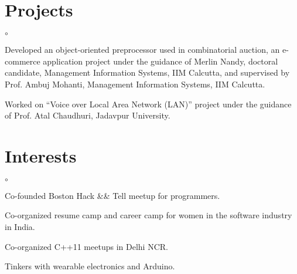 \documentclass[margin,line]{res}
\newenvironment{list2}{
  \begin{list}{$\circ$}{%
      \setlength{\itemsep}{0in}
      \setlength{\parsep}{0in} \setlength{\parskip}{0in}
      \setlength{\topsep}{0in} \setlength{\partopsep}{0in}
      \setlength{\leftmargin}{0.2in}}}{\end{list}}
\begin{document}
\begin{resume}
\section{\sc Projects}
\begin{list2} %
\item Developed an object-oriented preprocessor used in combinatorial auction, an e-commerce application project under the guidance of Merlin Nandy, doctoral candidate, Management Information Systems, IIM Calcutta, and supervised by Prof. Ambuj Mohanti, Management Information Systems, IIM Calcutta.
\item Worked on “Voice over Local Area Network (LAN)” project under the guidance of Prof. Atal Chaudhuri, Jadavpur University.
\end{list2}
\section{\sc Interests}
\begin{list2} %
\item Co-founded Boston Hack \&\& Tell meetup for programmers.
\item Co-organized resume camp and career camp for women in the software industry in India.
\item Co-organized C++11 meetups in Delhi NCR.
\item Tinkers with wearable electronics and Arduino.
\end{list2}

\end{resume}
\end{document}
